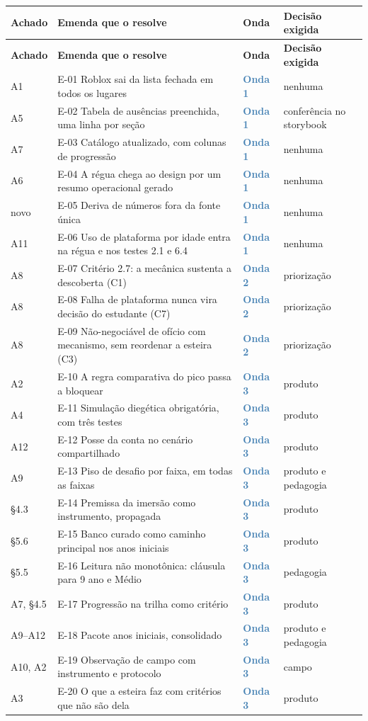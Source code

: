 \documentclass[11pt,a4paper]{article}
\newcommand{\onda}[1]{\textcolor{SteelBlue}{\textbf{Onda #1}}}
\begin{document}
\begin{longtable}{@{}p{1.5cm} p{6.7cm} p{1.9cm} p{3.4cm}@{}}
\toprule
\textbf{Achado} & \textbf{Emenda que o resolve} & \textbf{Onda} & \textbf{Decisão exigida} \\
\midrule
\endfirsthead
\toprule
\textbf{Achado} & \textbf{Emenda que o resolve} & \textbf{Onda} & \textbf{Decisão exigida} \\
\midrule
\endhead
\bottomrule
\endfoot
A1  & E-01 Roblox sai da lista fechada em todos os lugares & \onda{1} & nenhuma \\
A5  & E-02 Tabela de ausências preenchida, uma linha por seção & \onda{1} & conferência no storybook \\
A7  & E-03 Catálogo atualizado, com colunas de progressão & \onda{1} & nenhuma \\
A6  & E-04 A régua chega ao design por um resumo operacional gerado & \onda{1} & nenhuma \\
novo & E-05 Deriva de números fora da fonte única & \onda{1} & nenhuma \\
A11 & E-06 Uso de plataforma por idade entra na régua e nos testes 2.1 e 6.4 & \onda{1} & nenhuma \\
A8  & E-07 Critério 2.7: a mecânica sustenta a descoberta (C1) & \onda{2} & priorização \\
A8  & E-08 Falha de plataforma nunca vira decisão do estudante (C7) & \onda{2} & priorização \\
A8  & E-09 Não-negociável de ofício com mecanismo, sem reordenar a esteira (C3) & \onda{2} & priorização \\
A2  & E-10 A regra comparativa do pico passa a bloquear & \onda{3} & produto \\
A4  & E-11 Simulação diegética obrigatória, com três testes & \onda{3} & produto \\
A12 & E-12 Posse da conta no cenário compartilhado & \onda{3} & produto \\
A9  & E-13 Piso de desafio por faixa, em todas as faixas & \onda{3} & produto e pedagogia \\
\S4.3 & E-14 Premissa da imersão como instrumento, propagada & \onda{3} & produto \\
\S5.6 & E-15 Banco curado como caminho principal nos anos iniciais & \onda{3} & produto \\
\S5.5 & E-16 Leitura não monotônica: cláusula para 9\textordmasculine{} ano e Médio & \onda{3} & pedagogia \\
A7, \S4.5 & E-17 Progressão na trilha como critério & \onda{3} & produto \\
A9--A12 & E-18 Pacote anos iniciais, consolidado & \onda{3} & produto e pedagogia \\
A10, A2 & E-19 Observação de campo com instrumento e protocolo & \onda{3} & campo \\
A3  & E-20 O que a esteira faz com critérios que não são dela & \onda{3} & produto \\
\end{longtable}
\end{document}
